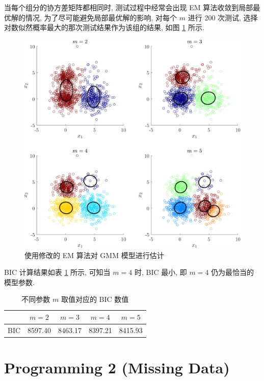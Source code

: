 \documentclass{article}
\begin{document}
当每个组分的协方差矩阵都相同时, 测试过程中经常会出现 EM 算法收敛到局部最优解的情况, 为了尽可能避免局部最优解的影响, 对每个 $m$ 进行 200 次测试, 选择对数似然概率最大的那次测试结果作为该组的结果, 如图 \ref{fig:gmmemeq} 所示.

\begin{figure}[htbp]
  \centering
  \includegraphics[width=6in]{gmmem-eqcov.pdf}
  \caption{使用修改的 EM 算法对 GMM 模型进行估计}
  \label{fig:gmmemeq}
\end{figure}

BIC 计算结果如表 \ref{tab:biceq} 所示, 可知当 $m=4$ 时, BIC 最小, 即 $m=4$ 仍为最恰当的模型参数. 

\begin{table}[htbp]
  \centering
  \caption{不同参数 $m$ 取值对应的 BIC 数值}
  \label{tab:biceq}
  \begin{tabular}{ccccc}
    \hline
        & $m=2$ & $m=3$ & $m=4$ & $m=5$ \\
    \hline
    BIC & 8597.40 & 8463.17 & 8397.21 & 8415.93\\
    \hline
  \end{tabular}
\end{table}

\newpage
\section*{Programming 2 (Missing Data)}
\end{document}
